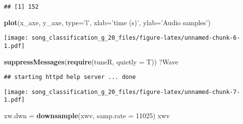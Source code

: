 \documentclass[]{article}
\newenvironment{Shaded}{\begin{snugshade}}{\end{snugshade}}
\newcommand{\KeywordTok}[1]{\textcolor[rgb]{0.13,0.29,0.53}{\textbf{#1}}}
\newcommand{\DataTypeTok}[1]{\textcolor[rgb]{0.13,0.29,0.53}{#1}}
\newcommand{\DecValTok}[1]{\textcolor[rgb]{0.00,0.00,0.81}{#1}}
\newcommand{\StringTok}[1]{\textcolor[rgb]{0.31,0.60,0.02}{#1}}
\newcommand{\CommentTok}[1]{\textcolor[rgb]{0.56,0.35,0.01}{\textit{#1}}}
\newcommand{\OperatorTok}[1]{\textcolor[rgb]{0.81,0.36,0.00}{\textbf{#1}}}
\newcommand{\NormalTok}[1]{#1}
\begin{document}
\begin{verbatim}
## [1] 152
\end{verbatim}

\begin{Shaded}
\begin{Highlighting}[]
\KeywordTok{plot}\NormalTok{(x_axe,}
\NormalTok{     y_axe,}
     \DataTypeTok{type=}\StringTok{'l'}\NormalTok{,}
     \DataTypeTok{xlab=}\StringTok{'time (s)'}\NormalTok{,}
     \DataTypeTok{ylab=}\StringTok{'Audio samples'}\NormalTok{)}
\end{Highlighting}
\end{Shaded}

\texttt{[image: song\_classification\_g\_20\_files/figure-latex/unnamed-chunk-6-1.pdf]}

\begin{Shaded}
\begin{Highlighting}[]
\KeywordTok{suppressMessages}\NormalTok{(}\KeywordTok{require}\NormalTok{(tuneR, }\DataTypeTok{quietly =}\NormalTok{ T))}
\NormalTok{?Wave}
\end{Highlighting}
\end{Shaded}

\begin{verbatim}
## starting httpd help server ... done
\end{verbatim}

\begin{Shaded}
\end{Shaded}

\texttt{[image: song\_classification\_g\_20\_files/figure-latex/unnamed-chunk-7-1.pdf]}

\begin{Shaded}
\begin{Highlighting}[]
\NormalTok{xw.dwn =}\StringTok{ }\KeywordTok{downsample}\NormalTok{(xwv, }\DataTypeTok{samp.rate =} \DecValTok{11025}\NormalTok{)}
\NormalTok{xwv}
\end{Highlighting}
\end{Shaded}
\end{document}
